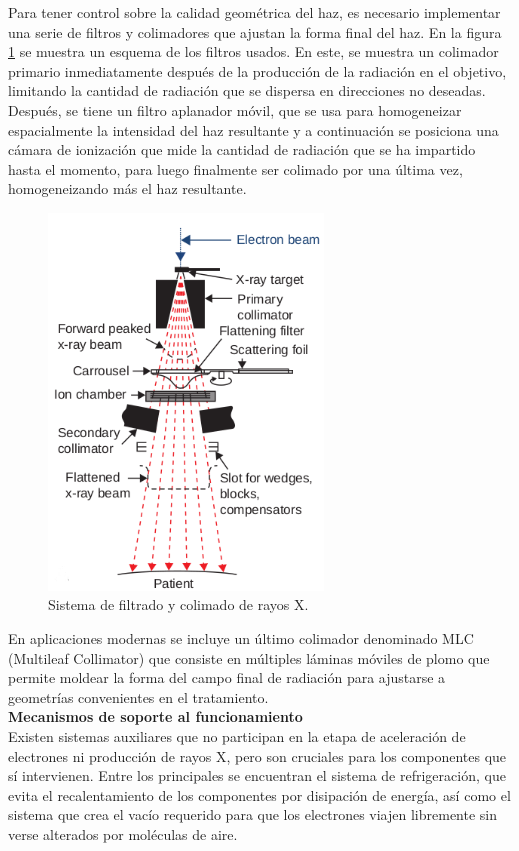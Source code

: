 Para tener control sobre la calidad geométrica del haz, es necesario implementar una serie de filtros y colimadores que ajustan la forma final del haz. En la figura \ref{fig:filtrosRayosX} se muestra un esquema de los filtros usados. En este, se muestra un colimador primario inmediatamente después de la producción de la radiación en el objetivo, limitando la cantidad de radiación que se dispersa en direcciones no deseadas. Después, se tiene un filtro aplanador móvil, que se usa para homogeneizar espacialmente la intensidad del haz resultante y a continuación se posiciona una cámara de ionización que mide la cantidad de radiación que se ha impartido hasta el momento, para luego finalmente ser colimado por una última vez, homogeneizando más el haz resultante.\\
\begin{figure}[H]
	\centering
	\includegraphics[width=0.7\linewidth, height=10cm]{images/filtros.png}
	\caption{Sistema de filtrado y colimado de rayos X\cite{khan2014the}.}
	\label{fig:filtrosRayosX}
\end{figure}
En aplicaciones modernas se incluye un último colimador denominado MLC (Multileaf Collimator) que consiste en múltiples láminas móviles de plomo que permite moldear la forma del campo final de radiación para ajustarse a geometrías convenientes en el tratamiento\cite{Burman2002}.\\


\textbf{Mecanismos de soporte al funcionamiento}\\

Existen sistemas auxiliares que no participan en la etapa de aceleración de electrones ni producción de rayos X, pero son cruciales para los componentes que sí intervienen. Entre los principales se encuentran el sistema de refrigeración, que evita el recalentamiento de los componentes por disipación de energía, así como el sistema que crea el vacío requerido para que los electrones viajen libremente sin verse alterados por moléculas de aire.\\

